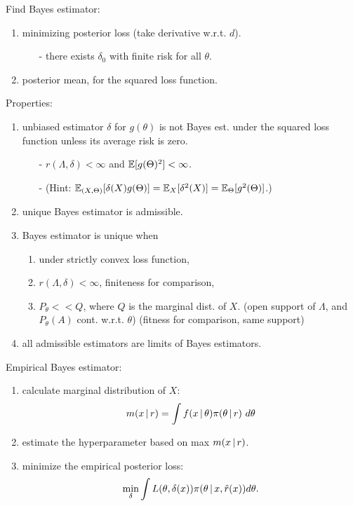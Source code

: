 Find Bayes estimator: 
    \begin{enumerate}[
        leftmargin = 2em,
    ]
    \item minimizing posterior loss (take derivative w.r.t. $d$). \begin{itemize}
        \item[-] there exists $\delta_0$ with finite risk for all $\theta$.
    \end{itemize}
    \item posterior mean, for the squared loss function.
\end{enumerate}

Properties: \begin{enumerate}[
        leftmargin = 2em,
    ]
    \item unbiased estimator $\delta$ for $g(\theta)$ is not Bayes est. under the squared loss function unless its average risk is zero. 
        \begin{itemize}[leftmargin=2em]
            \item [-] $r(\Lambda, \delta) < \infty$ and $\mathbb{E}[g(\Theta)^2] < \infty$.
            \item [-] (Hint: $\mathbb{E}_{(X, \Theta)}[\delta(X) g(\Theta)] = \mathbb{E}_X[ \delta^2(X) ] = \mathbb{E}_\Theta[g^2(\Theta)]$.)
        \end{itemize}
    \item unique Bayes estimator is admissible.
    \item Bayes estimator is unique when \begin{enumerate}
        \item under strictly convex loss function,
        \item $r(\Lambda, \delta) < \infty$, finiteness for comparison,
        \item $P_\theta << Q$, where $Q$ is the marginal dist. of $X$.
            \newline (open support of $\Lambda$, and $P_\theta(A)$ cont. w.r.t. $\theta$)
            \newline (fitness for comparison, same support)
    \end{enumerate}
    \item all admissible estimators are limits of Bayes estimators.
\end{enumerate}

Empirical Bayes estimator: \begin{enumerate}[
        leftmargin = 2em,
    ]
    \item calculate marginal distribution of $X$: $$
        m(x\, | \, r) = \int f(x\, | \, \theta) \pi(\theta \, | \, r)\ d\theta
    $$
    \item estimate the hyperparameter based on max $m(x\, | \, r)$.
    \item minimize the empirical posterior loss: $$
        \min_\delta \int L(\theta, \delta(x)) \pi(\theta\, | \, x, \hat{r}(x)) d\theta.
    $$
\end{enumerate}


